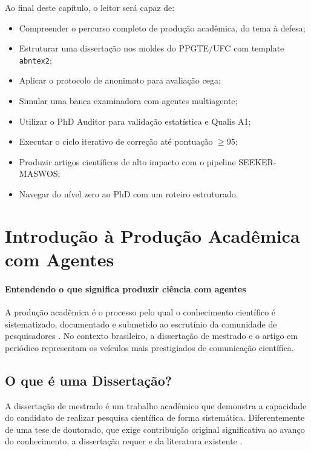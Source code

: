 Ao final deste capítulo, o leitor será capaz de:
\begin{itemize}
\item Compreender o percurso completo de produção acadêmica, do tema à defesa;
\item Estruturar uma dissertação nos moldes do PPGTE/UFC com template \texttt{abntex2};
\item Aplicar o protocolo de anonimato para avaliação cega;
\item Simular uma banca examinadora com agentes multiagente;
\item Utilizar o PhD Auditor para validação estatística e Qualis A1;
\item Executar o ciclo iterativo de correção até pontuação $\geq 95$;
\item Produzir artigos científicos de alto impacto com o pipeline SEEKER-MASWOS;
\item Navegar do nível zero ao PhD com um roteiro estruturado.
\end{itemize}

\section{Introdução à Produção Acadêmica com Agentes}
\label{sec:introducao-producao-academica}
\nivelzero

\paragraph{Entendendo o que significa produzir ciência com agentes} A produção acadêmica é o processo pelo qual o conhecimento científico é
sistematizado, documentado e submetido ao escrutínio da comunidade de
pesquisadores \cite{popper2005logica}. No contexto brasileiro, a dissertação de
mestrado e o artigo em periódico \qualisA{} representam os veículos mais
prestigiados de comunicação científica.

\subsection{O que é uma Dissertação?}

A dissertação de mestrado é um trabalho acadêmico que demonstra a capacidade do
candidato de realizar pesquisa científica de forma sistemática. Diferentemente de
uma tese de doutorado, que exige contribuição original significativa ao avanço do
conhecimento, a dissertação requer  e
 da literatura existente
\cite{abnt2023nbr14724}.

